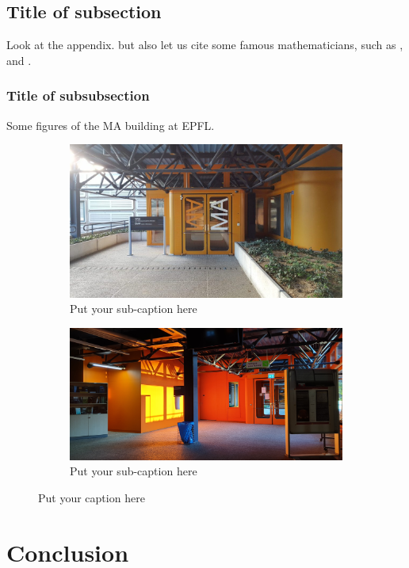 \documentclass{article}
\begin{document}
\subsection{Title of subsection}

Look at the appendix. but also let us cite some famous mathematicians, such as  \citet{Eul1795}, \citet{Fisher:1950} and \citet{Mir06}.

\subsubsection{Title of subsubsection}

Some figures of the MA building at EPFL. 

\begin{figure}[h]
	\begin{subfigure}[b]{.5\textwidth}
		\includegraphics[width=.8\linewidth]{exterieur}  
		\caption{Put your sub-caption here}
		\label{fig:sub-first}
	\end{subfigure}
	\begin{subfigure}[b]{.5\textwidth}
		\includegraphics[width=.8\linewidth]{interieur}  
		\caption{Put your sub-caption here}
		\label{fig:sub-second}
	\end{subfigure}
	\caption{Put your caption here}
	\label{fig:fig}
\end{figure}
\section{Conclusion}
\end{document}

